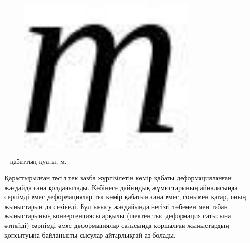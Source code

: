 \begin{figure}[H]
	\centering
	\includegraphics[width=0.8\textwidth]{assets/1314}
	\caption*{}
\end{figure} -- қабаттың қуаты, м.

Қарастырылған тәсіл тек қазба жүргізілетін көмір қабаты деформацияланған
жағдайда ғана қолданылады. Көбінесе дайындық жұмыстарының айналасында
серпімді емес деформациялар тек көмір қабатын ғана емес, сонымен қатар,
оның жыныстарын да сезінеді. Бұл ығысу жағдайында негізгі төбемен мен
табан жыныстарының конвергенциясы арқылы (шектен тыс деформация сатысына
өтпейді) серпімді емес деформациялар саласында қоршалған жыныстардың
қопсытуына байланысты сысулар айтарлықтай аз болады.

